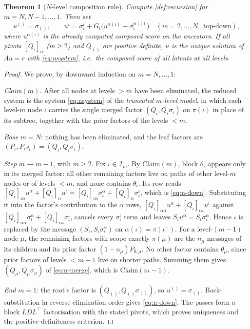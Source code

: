 \documentclass[11pt]{article}
\newtheorem{theorem}{Theorem}
\theoremstyle{definition}
\theoremstyle{remark}
\newcommand{\T}{\top}
\begin{document}
\begin{theorem}[$N$-level composition rule]\label{thm:nlevel}
Compute \cref{def:recursion} for $m=N,N-1,\dots,1$. Then set
\begin{equation}\label{eq:n-down}
u^{()}=\sigma_{()},\qquad
u^{\iota}=\sigma^{\iota}_\iota+G_\iota\big(u^{\alpha(\iota)}-\sigma^{\alpha(\iota)}_\iota\big)\quad(m=2,\dots,N,\text{ top-down}),
\end{equation}
where $u^{\alpha(\iota)}$ is the already computed composed score on the ancestors.
If all pivots $[Q_\iota]_{\iota\iota}$ ($m\ge2$) and $Q_{()}$ are positive definite,
$u$ is the unique solution of $\Lambda u=r$ with \eqref{eq:nsystem}, i.e.\ the
composed score of \emph{all} latents at all levels.
\end{theorem}
\begin{proof}
We prove, by downward induction on $m=N,\dots,1$:

\emph{Claim$(m)$.} After all nodes at levels $>m$ have been eliminated,
the reduced system is the system \eqref{eq:nsystem} of the \emph{truncated
$m$-level model}, in which each level-$m$ node $\iota$ carries the single merged
factor $(Q_\iota,Q_\iota\sigma_\iota)$ on $\pi(\iota)$ in place of its subtree,
together with the prior factors of the levels $<m$.

\emph{Base} $m=N$: nothing has been eliminated, and the leaf factors are
$(P_\iota,P_\iota s_\iota)=(Q_\iota,Q_\iota\sigma_\iota)$.

\emph{Step} $m\to m-1$, with $m\ge2$. Fix $\iota\in\mathcal{I}_m$. By Claim$(m)$, block
$\theta_\iota$ appears only in its merged factor: all other remaining factors live
on paths of other level-$m$ nodes or of levels $<m$, and none contains
$\theta_\iota$. Its row reads
$[Q_\iota]_{\iota\alpha}u^{\alpha}+[Q_\iota]_{\iota\iota}u^\iota=[Q_\iota]_{\iota\alpha}\sigma^\alpha_\iota+[Q_\iota]_{\iota\iota}\sigma^\iota_\iota$,
which is \eqref{eq:n-down}. Substituting it into the factor's contribution to the
$\alpha$ rows, $[Q_\iota]_{\alpha\alpha}u^\alpha+[Q_\iota]_{\alpha\iota}u^\iota$ against
$[Q_\iota]_{\alpha\alpha}\sigma^\alpha_\iota+[Q_\iota]_{\alpha\iota}\sigma^\iota_\iota$,
cancels every $\sigma^\iota_\iota$ term and leaves $S_\iota u^\alpha=S_\iota\sigma^\alpha_\iota$.
Hence $\iota$ is replaced by the message $(S_\iota,S_\iota\sigma_\iota^{\alpha})$ on
$\alpha(\iota)=\pi(\iota^-)$. For a level-$(m-1)$ node $\mu$, the remaining factors
with scope exactly $\pi(\mu)$ are the $n_\mu$ messages of its children and its prior
factor $(1-n_\mu)P_{0,\mu}$. No other factor contains $\theta_\mu$, since prior
factors of levels $<m-1$ live on shorter paths. Summing them gives
$(Q_\mu,Q_\mu\sigma_\mu)$ of \eqref{eq:n-merge}, which is Claim$(m-1)$.

\emph{End} $m=1$: the root's factor is $(Q_{()},Q_{()}\sigma_{()})$, so $u^{()}=\sigma_{()}$.
Back-substitution in reverse elimination order gives \eqref{eq:n-down}. The passes
form a block $LDL^\T$ factorisation with the stated pivots, which proves uniqueness
and the positive-definiteness criterion.
\end{proof}
\end{document}

